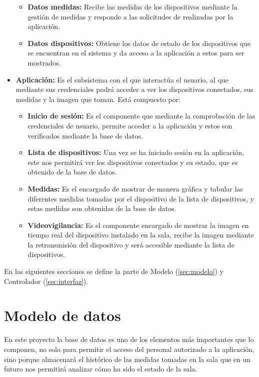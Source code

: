 \begin{itemize}
\begin{itemize}
		      \item \textbf{Datos medidas:} Recibe las medidas de los dispositivos mediante la gestión de medidas y responde a las solicitudes de realizadas por la aplicación.
		      \item \textbf{Datos dispositivos:} Obtiene los datos de estado de los dispositivos que se encuentran en el sistema y da acceso a la aplicación a estos para ser mostrados.
	      \end{itemize}
	\item \textbf{Aplicación:} Es el subsistema con el que interactúa el usuario, al que mediante sus credenciales podrá acceder a ver los dispositivos conectados, sus medidas y la imagen que toman. Está compuesto por:
	      \begin{itemize}
		      \item \textbf{Inicio de sesión:} Es el componente que mediante la comprobación de las credenciales de usuario, permite acceder a la aplicación y estos son verificados mediante la base de datos.
		      \item \textbf{Lista de dispositivos:} Una vez se ha iniciado sesión en la aplicación, este nos permitirá ver los dispositivos conectados y su estado, que es obtenido de la base de datos.
		      \item \textbf{Medidas:} Es el encargado de mostrar de manera gráfica y tabular las diferentes medidas tomadas por el dispositivo de la lista de dispositivos, y estas medidas son obtenidas de la base de datos.
		      \item \textbf{Videovigilancia:} Es el componente encargado de mostrar la imagen en tiempo real del dispositivo instalado en la sala, recibe la imagen mediante la retransmisión del dispositivo y será accesible mediante la lista de dispositivos.
	      \end{itemize}
\end{itemize}

En las siguientes secciones se define la parte de Modelo (\autoref{sec:modelo}) y Controlador (\autoref{sec:interfaz}).
\pagebreak

\section{Modelo de datos}\label{sec:modelo}
En este proyecto la base de datos es uno de los elementos más importantes que lo componen, no solo para permitir el acceso del personal autorizado a la aplicación, sino porque almacenará el histórico de las medidas tomadas en la sala que en un futuro nos permitirá analizar cómo ha sido el estado de la sala.


